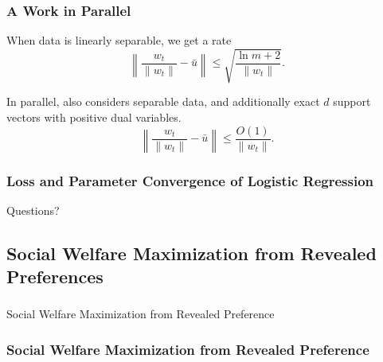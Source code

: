 \documentclass{beamer}
\begin{document}
\begin{frame}
\frametitle{A Work in Parallel}
When data is linearly separable, we get a rate
\begin{equation*}
    \left\|\frac{w_t}{\|w_t\|}-\bar{u}\right\|\le\sqrt{\frac{\ln m+2}{\|w_t\|}}.
\end{equation*}

In parallel, \cite{SHS17} also considers separable data, and additionally exact $d$ support vectors with positive dual variables.
\begin{equation*}
    \left\|\frac{w_t}{\|w_t\|}-\bar{u}\right\|\le \frac{O(1)}{\|w_t\|}.
\end{equation*}
\end{frame}

\begin{frame}
\frametitle{Loss and Parameter Convergence of Logistic Regression}
\Large Questions?
\end{frame}

\subsection{Social Welfare Maximization from Revealed Preferences}
\begin{frame}
\frametitle{\phantom{}}
\Large Social Welfare Maximization from Revealed Preference
\end{frame}

\begin{frame}
\frametitle{Social Welfare Maximization from Revealed Preference}
\begin{itemize}
\end{itemize}
\end{frame}
\end{document}

